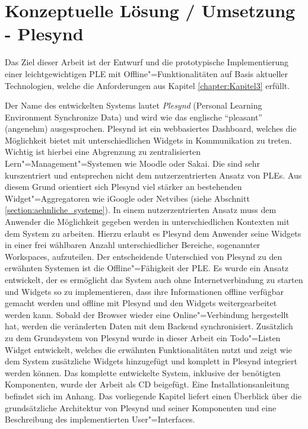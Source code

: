 \chapter{Konzeptuelle Lösung / Umsetzung - Plesynd}\label{chapter:Kapitel5}

Das Ziel dieser Arbeit ist der Entwurf und die prototypische Implementierung einer leichtgewichtigen \ac{PLE} mit Offline"=Funktionalitäten auf Basis aktueller Technologien, welche die Anforderungen aus Kapitel \ref{chapter:Kapitel3} erfüllt. 

Der Name des entwickelten Systems lautet \emph{Plesynd} (Personal Learning Environment Synchronize Data) und wird wie das englische "`pleasant"' (angenehm) ausgesprochen. Plesynd ist ein webbasiertes Dashboard, welches die Möglichkeit bietet mit unterschiedlichen Widgets in Kommunikation zu treten. Wichtig ist hierbei eine Abgrenzung zu zentralisierten Lern"=Management"=Systemen wie Moodle oder Sakai. Die sind sehr kurszentriert und entsprechen nicht dem nutzerzentrierten Ansatz von \acp{PLE}. Aus diesem Grund orientiert sich Plesynd viel stärker an bestehenden Widget"=Aggregatoren wie iGoogle oder Netvibes (siehe Abschnitt \ref{section:aehnliche_systeme}). In einem nutzerzentrierten Ansatz muss dem Anwender die Möglichkeit gegeben werden in unterschiedlichen Kontexten mit dem System zu arbeiten. Hierzu erlaubt es Plesynd dem Anwender seine Widgets in einer frei wählbaren Anzahl unterschiedlicher Bereiche, sogenannter Workspaces, aufzuteilen. Der entscheidende Unterschied von Plesynd zu den erwähnten Systemen ist die Offline"=Fähigkeit der \ac{PLE}. Es wurde ein Ansatz entwickelt, der es ermöglicht das System auch ohne Internetverbindung zu starten und Widgets so zu implementieren, dass ihre Informationen offline verfügbar gemacht werden und offline mit Plesynd und den Widgets weitergearbeitet werden kann. Sobald der Browser wieder eine Online"=Verbindung hergestellt hat, werden die veränderten Daten mit dem Backend synchronisiert. Zusätzlich zu dem Grundsystem von Plesynd wurde in dieser Arbeit ein Todo"=Listen Widget entwickelt, welches die erwähnten Funktionalitäten nutzt und zeigt wie dem System zusätzliche Widgets hinzugefügt und komplett in Plesynd integriert werden können. Das komplette entwickelte System, inklusive der benötigten Komponenten, wurde der Arbeit als CD beigefügt. Eine Installationsanleitung befindet sich im Anhang. Das vorliegende Kapitel liefert einen Überblick über die grundsätzliche Architektur von Plesynd und seiner Komponenten und eine Beschreibung des implementierten User"=Interfaces.
